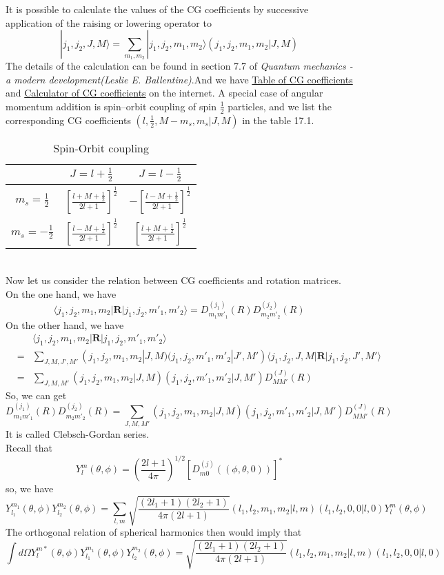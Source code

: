 It is possible to calculate the values of the CG coefficients by successive application of the raising or lowering operator to
\[|j_1,j_2,J,M\rangle = \sum_{m_1,m_2} |j_1,j_2,m_1,m_2\rangle (j_1,j_2,m_1,m_2|J,M)\]
The details of the calculation can be found in section 7.7 of \emph{Quantum mechanics - a modern development(Leslie E. Ballentine)}.And we have \href{https://en.wikipedia.org/wiki/Table_of_Clebsch-Gordan_coefficients}{Table of CG coefficients} and \href{http://www.wolframalpha.com/input/?i=CG+coefficient}{Calculator of CG coefficients} on the internet. A special case of angular momentum addition is spin–orbit coupling of spin $\frac{1}{2}$ particles, and we list the corresponding CG coefficients $(l,\frac{1}{2}, M-m_s, m_s|J,M)$ in the table 17.1.
\begin{table}[!th]
\centering
\begin{tabular}{|c|c|c|}
\hline
 & $J=l+\frac{1}{2}$ & $J=l-\frac{1}{2}$ \\
 \hline
 $m_s = \frac{1}{2}$ & $\left[ \frac{l+M+\frac{1}{2}}{2l+1}\right ]^{\frac{1}{2}} $ & $-\left[ \frac{l-M+\frac{1}{2}}{2l+1}\right ]^{\frac{1}{2}} $ \\
 \hline
 $m_s = -\frac{1}{2}$ & $\left[ \frac{l-M+\frac{1}{2}}{2l+1}\right ]^{\frac{1}{2}} $ & $\left[ \frac{l+M+\frac{1}{2}}{2l+1}\right ]^{\frac{1}{2}} $ \\
\hline
\end{tabular}
\caption{Spin-Orbit coupling}
\end{table}\\
Now let us consider the relation between CG coefficients and rotation matrices. On the one hand, we have
\[\langle j_1,j_2,m_1,m_2 | \bm{R} | j_1,j_2,m'_1,m'_2\rangle = D_{m_1m'_1}^{(j_1)}(R) D_{m_2m'_2}^{(j_2)}(R)\]
On the other hand, we have
\begin{eqnarray}
&\phantom{=}& \langle j_1,j_2,m_1,m_2 | \bm{R} | j_1,j_2,m'_1,m'_2\rangle \nonumber \\
&=& \sum_{J,M,J',M'} (j_1,j_2,m_1,m_2|J,M) (j_1,j_2,m'_1,m'_2|J',M')  \langle j_1,j_2,J,M | \bm{R} | j_1,j_2,J',M'\rangle \nonumber \\
&=& \sum_{J,M,M'} (j_1,j_2,m_1,m_2|J,M) (j_1,j_2,m'_1,m'_2|J,M')D_{MM'}^{(J)}(R) \nonumber
\end{eqnarray}
So, we can get
\[D_{m_1m'_1}^{(j_1)}(R) D_{m_2m'_2}^{(j_2)}(R) = \sum_{J,M,M'} (j_1,j_2,m_1,m_2|J,M) (j_1,j_2,m'_1,m'_2|J,M')D_{MM'}^{(J)}(R)\]
It is called Clebsch-Gordan series.\\
Recall that
\[Y_l^m(\theta,\phi) =  \left( \frac{2l+1}{4\pi} \right) ^{1/2} [D_{m0}^{(j)}((\phi,\theta,0))]^* \]
so, we have
\[Y_{l_1}^{m_1}(\theta,\phi) Y_{l_2}^{m_2}(\theta,\phi) = \sum_{l,m} \sqrt{\frac{(2l_1+1)(2l_2+1)}{4\pi(2l+1)}} (l_1,l_2,m_1,m_2|l,m) (l_1,l_2,0,0|l,0) Y_l^m(\theta,\phi)\]
The orthogonal relation of spherical harmonics then would imply that
\[\int d\Omega Y_l^{m*}(\theta,\phi)Y_{l_1}^{m_1}(\theta,\phi) Y_{l_2}^{m_2}(\theta,\phi) = \sqrt{\frac{(2l_1+1)(2l_2+1)}{4\pi(2l+1)}} (l_1,l_2,m_1,m_2|l,m) (l_1,l_2,0,0|l,0)\]

